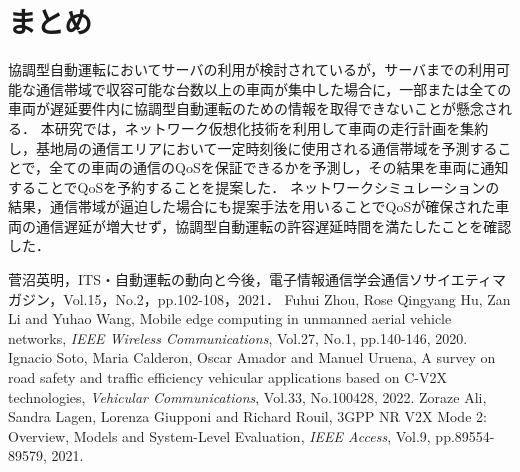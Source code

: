 \documentclass[a4paper,10pt,twocolumn,uplatex]{jsarticle}
\begin{document}
\section{まとめ}
協調型自動運転においてサーバの利用が検討されているが，サーバまでの利用可能な通信帯域で収容可能な台数以上の車両が集中した場合に，一部または全ての車両が遅延要件内に協調型自動運転のための情報を取得できないことが懸念される．
本研究では，ネットワーク仮想化技術を利用して車両の走行計画を集約し，基地局の通信エリアにおいて一定時刻後に使用される通信帯域を予測することで，全ての車両の通信のQoSを保証できるかを予測し，その結果を車両に通知することでQoSを予約することを提案した．
ネットワークシミュレーションの結果，通信帯域が逼迫した場合にも提案手法を用いることでQoSが確保された車両の通信遅延が増大せず，協調型自動運転の許容遅延時間を満たしたことを確認した．

\footnotesize{
  \begin{thebibliography}{99}
     菅沼英明，ITS・自動運転の動向と今後，電子情報通信学会通信ソサイエティマガジン，Vol.15，No.2，pp.102-108，2021．
     Fuhui Zhou, Rose Qingyang Hu, Zan Li and Yuhao Wang, Mobile edge computing in unmanned aerial vehicle networks, \textit{IEEE Wireless Communications}, Vol.27, No.1, pp.140-146, 2020.
     Ignacio Soto, Maria Calderon, Oscar Amador and Manuel Uruena, A survey on road safety and traffic efficiency vehicular applications based on C-V2X technologies, \textit{Vehicular Communications}, Vol.33, No.100428, 2022.
     Zoraze Ali, Sandra Lagen, Lorenza Giupponi and Richard Rouil, 3GPP NR V2X Mode 2: Overview, Models and System-Level Evaluation, \textit{IEEE Access},
    Vol.9, pp.89554-89579, 2021.
  \end{thebibliography}
}

% 
% 

\end{document}
